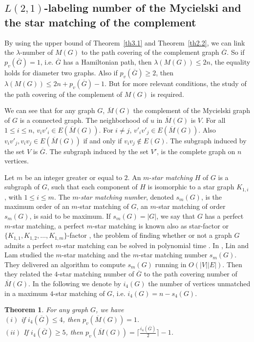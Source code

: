 \documentclass{article}
\newtheorem{theorem} {Theorem}
\newtheorem{open problem} {Open Problem}
\numberwithin{lemma}{section}
\numberwithin{theorem}{section}
\numberwithin{cor}{section}
\numberwithin{prop}{section}
\numberwithin{con}{section}
\numberwithin{claim}{section}
\numberwithin{obs}{section}
\numberwithin{dnt}{section}
\begin{document}
\subsection{$L(2,1)$-labeling number of the Mycielski and the star matching of the complement}
\par By using the upper bound of Theorem~\ref{th3.1} and Theorem~\ref{th2.2}, we can link the $\lambda$-number of $M(G)$ to the path covering of the complement graph $\overline{G}$. So if $p_v(\overline{G})=1$, i.e.  $\overline{G}$ has a Hamiltonian path, then $\lambda (M(G))\leq 2n$, the equality holds for diameter two graphs. Also if  $p_v(\overline{G})\geq 2$, then $\lambda(M(G))\leq 2n+p_v(\overline{G})-1$. But for more relevant conditions, the study of the path covering of the complement of $M(G)$ is required. \par
We can see that for any graph $G$,  $\overline{M}(G)$ the complement of the Mycielski graph of $G$ is a connected graph. The neighborhood of $u$ in $\overline{M}(G) $ is $V$. For all $1 \leq i \leq n$, $v_iv'_i\in E(\overline{M}(G))$. For $i\neq j$, $v'_iv'_j \in E(\overline{M}(G))$. Also  $v_iv'_j,v_iv_j \in E(\overline{M}(G)) $ if and only if $v_iv_j \notin E(G)$.  The subgraph induced by the set $V$ is $\overline{G}$. The subgraph induced by the set $V'$, is the complete graph on $n$ vertices.\par
Let $m$ be an integer greater or equal to $2$. An $m$-\textit{star matching} $H$ of $G$ is a subgraph of $G$, such that each component of $H$ is isomorphic to a star graph $K_{1,i}$, with $1 \leq i\leq m$. The $m$-\textit{star matching number}, denoted $s_m(G)$,  is the maximum order of an $m$-star matching of $G$, an $m$-star matching of order $s_m(G)$, is said to be maximum. If $s_m(G)=|G|$, we say that $G$ has a perfect $m$-star matching, a perfect $m$-star matching is known also as star-factor  or $\{K_{1,1},K_{1,2},\ldots,K_{1,m}\}$-factor \cite{kano,las}, the problem of finding whether or not a graph $G$ admits a perfect $m$-star matching can be solved in polynomial time \cite{kirk}. 
In \cite{lin}, Lin and Lam studied the $m$-star matching and the $m$-star matching number $s_m(G)$. They delivered an algorithm to compute $s_m(G)$ running in $O(|V||E|)$. Then they related the $4$-star matching number of $\overline{G}$ to the path covering number of $\overline{M}(G)$. In the following we denote by $i_4(G)$ the number of vertices unmatched in a maximum $4$-star matching of $G$, i.e. $i_4(G)=n-s_4(G)$. 
\begin{theorem}\label{th3.2} \cite{lin}
	For any graph $G$, we have\\
	$(i)$ if $i_4(\overline{G})\leq 4$, then $p_v(\overline{M}(G))=1$.\\
	$(ii)$ If $i_4(\overline{G})\geq 5$, then $p_v(\overline{M}(G))= \lceil \frac{i_4(\overline{G})}{2} \rceil -1$.
\end{theorem}
\end{document}
